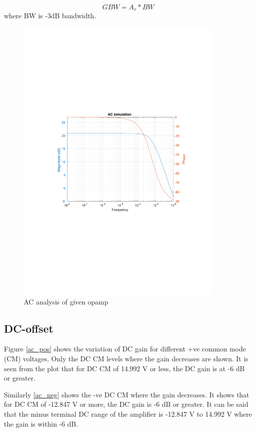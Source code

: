 \documentclass[12pt,a4paper,UKenglish]{article}
\begin{document}
\begin{equation*}
GBW = A_v*BW
\end{equation*}
where BW is -3dB bandwidth.
\begin{figure} [H]
  \centering 
  \includegraphics[width=0.9\textwidth]{img/1b.pdf} 
  \caption{AC analysis of given opamp}
  \label{ac_ana} 
\end{figure}

\subsection{DC-offset}
Figure  \ref{ac_pos}  shows the variation of DC gain for different +ve common mode (CM) voltages. Only the DC CM levels where the gain decreases are shown. It is seen from the plot that for DC CM of 14.992 V or less, the DC gain is at -6 dB or greater.

Similarly  \ref{ac_neg} shows the -ve DC CM where the gain  decreases. It shows that for DC CM of -12.847 V or more, the DC gain is -6 dB or greater. It can be said that the minus terminal DC range of the amplifier is -12.847 V to 14.992 V where the gain is within -6 dB.
\end{document}
